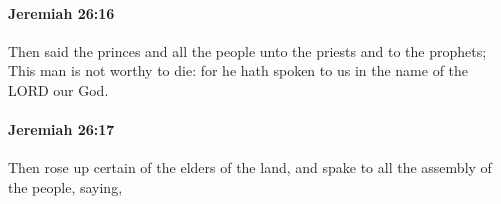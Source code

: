 		\paragraph{Jeremiah 26:16} %
			\label{JEREMIAH-26-16}

			Then said the princes and all the people unto the priests and to the prophets; This man is not worthy to die: for he hath spoken to us in the name of the LORD our God.


		\paragraph{Jeremiah 26:17} %
			\label{JEREMIAH-26-17}

			Then rose up certain of the elders of the land, and spake to all the assembly of the people, saying,


